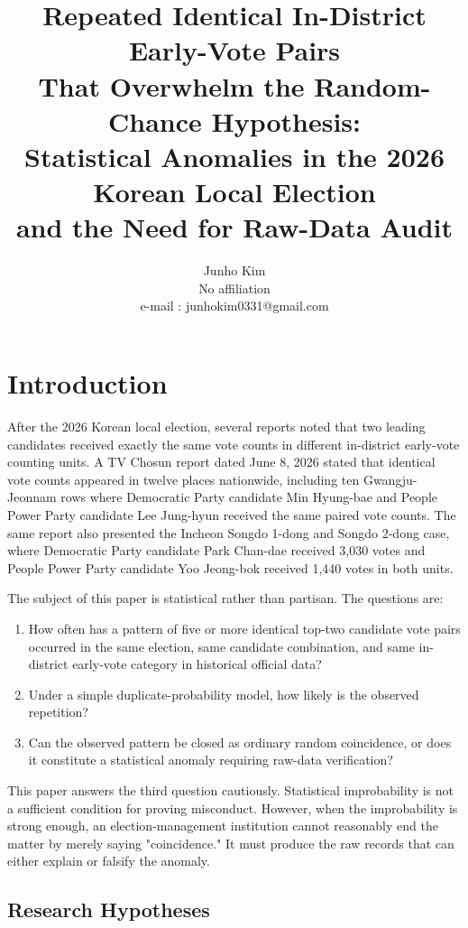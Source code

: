 \documentclass[preprint]{../ieie/IEIE}
\title{Repeated Identical In-District Early-Vote Pairs\\
That Overwhelm the Random-Chance Hypothesis:\\
Statistical Anomalies in the 2026 Korean Local Election\\
and the Need for Raw-Data Audit}
\author{Junho Kim \\ No affiliation \\ e-mail : junhokim0331@gmail.com}
\makeatletter
\renewcommand{\maketitle}{
  \twocolumn[
    \begin{center}
      \vspace*{3mm}
      {\fontsize{16pt}{19.2pt}\selectfont \@title \par}
      \vspace{12mm}
      {\fontsize{10pt}{14pt}\selectfont \@author \par}
      \vspace{8mm}
    \end{center}
  ]
}
\makeatother
\begin{document}
\maketitle
\makeabstract

\section{Introduction}

After the 2026 Korean local election, several reports noted that two leading candidates received exactly the same vote counts in different in-district early-vote counting units. A TV Chosun report dated June 8, 2026 stated that identical vote counts appeared in twelve places nationwide, including ten Gwangju-Jeonnam rows where Democratic Party candidate Min Hyung-bae and People Power Party candidate Lee Jung-hyun received the same paired vote counts. The same report also presented the Incheon Songdo 1-dong and Songdo 2-dong case, where Democratic Party candidate Park Chan-dae received 3,030 votes and People Power Party candidate Yoo Jeong-bok received 1,440 votes in both units.

The subject of this paper is statistical rather than partisan. The questions are:

\begin{enumerate}
\item How often has a pattern of five or more identical top-two candidate vote pairs occurred in the same election, same candidate combination, and same in-district early-vote category in historical official data?
\item Under a simple duplicate-probability model, how likely is the observed repetition?
\item Can the observed pattern be closed as ordinary random coincidence, or does it constitute a statistical anomaly requiring raw-data verification?
\end{enumerate}

This paper answers the third question cautiously. Statistical improbability is not a sufficient condition for proving misconduct. However, when the improbability is strong enough, an election-management institution cannot reasonably end the matter by merely saying "coincidence." It must produce the raw records that can either explain or falsify the anomaly.

\subsection{Research Hypotheses}
\end{document}

